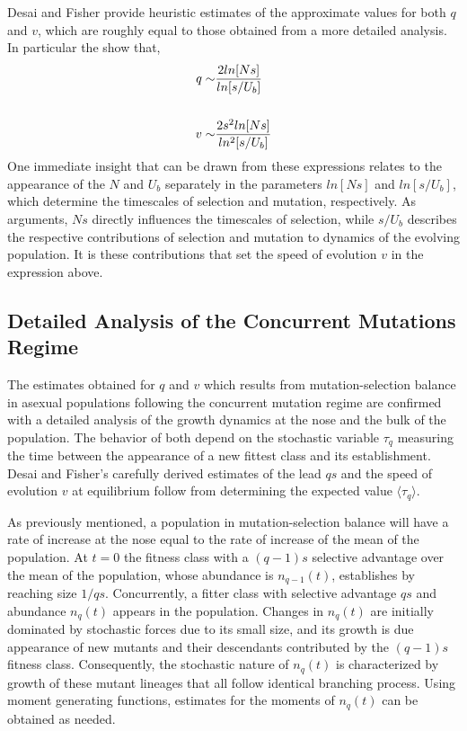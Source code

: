 \documentclass[12pt]{article}
\begin{document}
Desai and Fisher provide heuristic estimates of the approximate values for both $q$ and $v$, which are roughly equal to those obtained from a more detailed analysis.  In particular the show that,
\begin{equation}
\begin{aligned}
q \sim & {2ln[Ns] \over ln[s/U_b]} \\   
\\
v \sim & {2s^2ln[Ns] \over ln^2[s/U_b]}
\end{aligned}
\end{equation}
One immediate insight that can be drawn from these expressions relates to the appearance of the $N$ and $U_b$ separately in the parameters $ln[Ns]$ and $ln[s/U_b]$, which determine the timescales of selection and mutation, respectively.  As arguments, $Ns$ directly influences the timescales of selection, while $s/U_b$ describes the respective contributions of selection and mutation to dynamics of the evolving population.  It is these contributions that set the speed of evolution $v$ in the expression above.   

\subsection*{Detailed Analysis of the Concurrent Mutations Regime}
The estimates obtained for $q$ and $v$ which results from mutation-selection balance in asexual populations following the concurrent mutation regime are confirmed with a detailed analysis of the growth dynamics at the nose and the bulk of the population.  The behavior of both depend on the stochastic variable $\tau_q$ measuring the time between the appearance of a new fittest class and its establishment.  Desai and Fisher's carefully derived estimates of the lead $qs$ and the speed of evolution $v$ at equilibrium follow from determining the expected value $\langle \tau_q \rangle$.   

As previously mentioned, a population in mutation-selection balance will have a rate of increase at the nose equal to the rate of increase of the mean of the population.  At $t=0$ the fitness class with a $(q-1)s$ selective advantage over the mean of the population, whose abundance is $n_{q-1}(t)$, establishes by reaching size $1/qs$.  Concurrently, a fitter class with selective advantage $qs$ and abundance $n_q(t)$ appears in the population.  Changes in $n_q(t)$ are initially dominated by stochastic forces due to its small size, and its growth is due appearance of new mutants and their descendants contributed by the $(q-1)s$ fitness class. Consequently, the stochastic nature of $n_q(t)$ is characterized by growth of these mutant lineages that all follow identical branching process.  Using moment generating functions, estimates for the moments of $n_q(t)$ can be obtained as needed.
\end{document}
